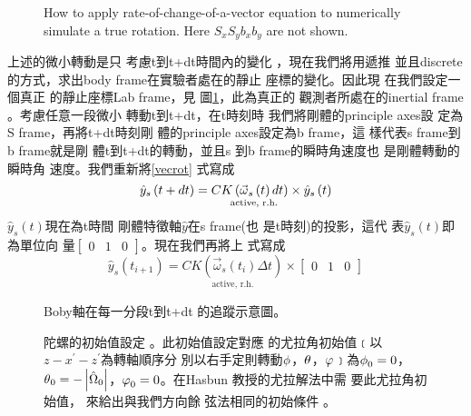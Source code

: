 \documentclass[12pt,twoside]{article}
\begin{document}
\begin{figure}[th]
\caption{How to apply rate-of-change-of-a-vector equation to numerically
simulate a true rotation. Here $S_{x}S_{y}b_{x}b_{y}$ are not shown.}
\label{szsbtdtfig}
\begin{center}
\fbox{}
\end{center}
\end{figure}

\bigskip

上述的微小轉動是只%
考慮t到t+dt時間內的變化%
，現在我們將用遞推%
並且discrete的方式，求出body
frame在實驗者處在的靜止%
座標的變化。因此現%
在我們設定一個真正%
的靜止座標Lab frame\thinspace ，見%
圖\ref{szsbtdtfig}，此為真正的%
觀測者所處在的inertial frame%
。考慮任意一段微小%
轉動t到t+dt，在t時刻時%
我們將剛體的principle axes設%
定為S frame，再將t+dt時刻剛%
體的principle axes設定為b frame，這%
樣代表s frame到b frame就是剛%
體t到t+dt的轉動，並且s%
到b frame的瞬時角速度也%
是剛體轉動的瞬時角%
速度。我們重新將\ref{vecrot}%
式寫成%
\begin{equation}
\hat{y}_{s}\left( t+dt\right) =\underset{\text{active, r.h.}}{CK\left( \vec{%
\omega}_{s}\left( t\right) dt\right) }\times \hat{y}_{s}\left( t\right)
\label{vecrot05}
\end{equation}%
$\hat{y}_{s}\left( t\right) $現在為t時間%
剛體特徵軸$\hat{y}$在s frame(也%
是t時刻)的投影，這代%
表$\hat{y}_{s}\left( t\right) $即為單位向%
量$\left[ 
\begin{array}{ccc}
0 & 1 & 0%
\end{array}%
\right] $。現在我們再將上%
式寫成%
\begin{equation}
\hat{y}_{s}\left( t_{i+1}\right) =\underset{\text{active, r.h.}}{CK\left( 
\vec{\omega}_{s}\left( t_{i}\right) \Delta t\right) }\times \left[ 
\begin{array}{ccc}
0 & 1 & 0%
\end{array}%
\right]  \label{vecrot1}
\end{equation}

\begin{figure}[th]
\caption{Boby軸在每一分段t到t+dt%
的追蹤示意圖。}
\begin{center}
\fbox{}
\end{center}
\end{figure}

\begin{figure}[th]
\caption{陀螺的初始值設定%
。此初始值設定對應%
的尤拉角初始值﹝以$%
z-x^{\prime }-z^{\prime }$為轉軸順序分%
別以右手定則轉動$\protect%
\phi $，$\protect\theta $，$\protect\varphi $﹞為$%
\protect\phi _{0}=0$，$\protect\theta _{0}=-\left\vert \hat{\Omega}%
_{0}\right\vert $，$\protect\varphi _{0}=0$。在Hasbun%
教授的尤拉解法中需%
要此尤拉角初始值，%
來給出與我們方向餘%
弦法相同的初始條件%
。}
\begin{center}
\fbox{}
\end{center}
\end{figure}
\end{document}
